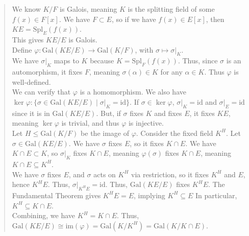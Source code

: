 \documentclass[10pt]{extarticle}
\begin{document}
  \begin{quote}
    We know $K/F$ is Galois, meaning $K$ is the splitting field of some $f(x)\in F[x]$. We have $F\subset E$, so if we have $f(x)\in E[x]$, then $KE = \text{Spl}_{E}(f(x))$.\\

    This gives $KE/E$ is Galois.\\

    Define $\varphi: \text{Gal}(KE/E) \rightarrow \text{Gal}(K/F)$, with $\sigma \mapsto \sigma|_{K}$.\\

    We have $\sigma|_{K}$ maps to $K$ because $K = \text{Spl}_{F}(f(x))$. Thus, since $\sigma$ is an automorphism, it fixes $F$, meaning $\sigma(\alpha)\in K$ for any $\alpha \in K$. Thus $\varphi$ is well-defined.\\

    We can verify that $\varphi$ is a homomorphism. We also have $\ker\varphi: \{\sigma\in \text{Gal}(KE/E)\mid \sigma|_{K} = \text{id}\}$. If $\sigma\in\ker\varphi$, $\sigma|_{K} = \text{id}$ and $\sigma|_{E} = \text{id}$ since it is in $\text{Gal}(KE/E)$. But, if $\sigma$ fixes $K$ and fixes $E$, it fixes $KE$, meaning $\ker\varphi$ is trivial, and thus $\varphi$ is injective.\\

    Let $H\leq \text{Gal}(K/F)$ be the image of $\varphi$. Consider the fixed field $K^{H}$. Let $\sigma \in \text{Gal}(KE/E)$. We have $\sigma$ fixes $E$, so it fixes $K\cap E$. We have $K\cap E\subset K$, so $\sigma|_{K}$ fixes $K\cap E$, meaning $\varphi(\sigma)$ fixes $K\cap E$, meaning $K\cap E\subseteq K^{H}$.\\

    We have $\sigma$ fixes $E$, and $\sigma$ acts on $K^{H}$ via restriction, so it fixes $K^{H}$ and $E$, hence $K^{H}E$. Thus, $\sigma|_{K^{H}E} = \text{id}$. Thus, $\text{Gal}(KE/E)$ fixes $K^{H}E$. The Fundamental Theorem gives $K^{H}E = E$, implying $K^{H}\subseteq E$ In particular, $K^{H} \subseteq K\cap E$.\\

    Combining, we have $K^{H} = K\cap E$. Thus, $\text{Gal}(KE/E) \cong \text{im}(\varphi) = \text{Gal}(K/K^{H}) = \text{Gal}(K/K\cap E)$.
  \end{quote}
\end{document}
